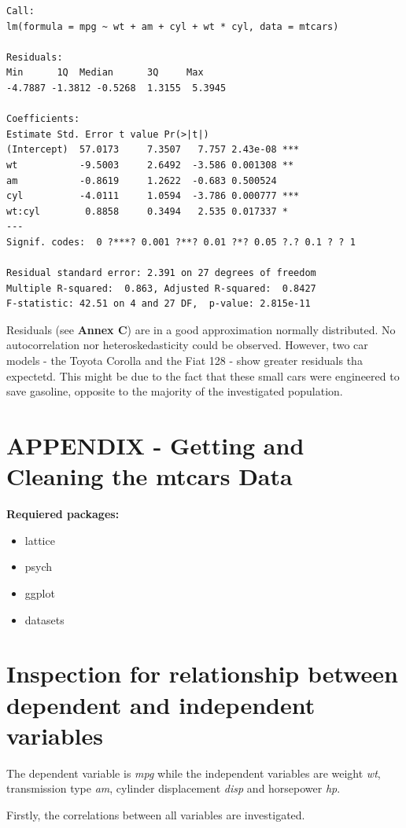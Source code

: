 \documentclass[10pt,a4paper]{article}
\begin{document}
\begin{verbatim}
Call:
lm(formula = mpg ~ wt + am + cyl + wt * cyl, data = mtcars)

Residuals:
Min      1Q  Median      3Q     Max 
-4.7887 -1.3812 -0.5268  1.3155  5.3945 

Coefficients:
Estimate Std. Error t value Pr(>|t|)    
(Intercept)  57.0173     7.3507   7.757 2.43e-08 ***
wt           -9.5003     2.6492  -3.586 0.001308 ** 
am           -0.8619     1.2622  -0.683 0.500524    
cyl          -4.0111     1.0594  -3.786 0.000777 ***
wt:cyl        0.8858     0.3494   2.535 0.017337 *  
---
Signif. codes:  0 ?***? 0.001 ?**? 0.01 ?*? 0.05 ?.? 0.1 ? ? 1

Residual standard error: 2.391 on 27 degrees of freedom
Multiple R-squared:  0.863,	Adjusted R-squared:  0.8427 
F-statistic: 42.51 on 4 and 27 DF,  p-value: 2.815e-11
\end{verbatim}		
Residuals (see \textbf{Annex C}) are in a good approximation normally distributed. No autocorrelation nor heteroskedasticity could be observed.
However, two car models - the Toyota Corolla and the Fiat 128 - show greater residuals tha expectetd. This might be due to the fact that these small cars were engineered to save gasoline, opposite to the majority of the investigated population.
\newpage
\appendix
\section{APPENDIX -  Getting and Cleaning the mtcars Data}
\textbf{Requiered packages:}
\begin{itemize}
	\item lattice
	\item psych
	\item ggplot
	\item datasets
\end{itemize}

\section{Inspection for relationship between dependent and independent variables}

The dependent variable is \textit{mpg} while the independent variables are weight \textit{wt}, transmission type \textit{am}, cylinder displacement \textit{disp} and horsepower \textit{hp}. 

Firstly, the correlations between all variables are investigated.
\end{document}
